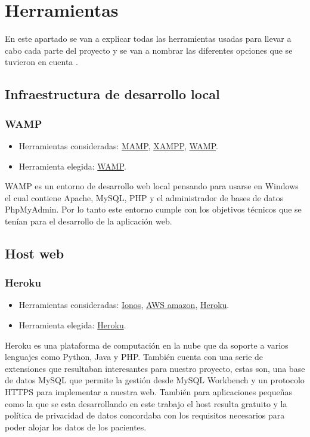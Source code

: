 \section{Herramientas} 

En este apartado se van a explicar todas las herramientas usadas para llevar a cabo cada parte del proyecto y se van a nombrar las diferentes opciones que se tuvieron en cuenta .

\subsection{Infraestructura de desarrollo local}

\subsubsection{WAMP}
\begin{itemize}
    \item Herramientas consideradas: \href{https://www.mamp.info/en/windows/}{MAMP}, \href{https://www.apachefriends.org/es/index.html}{XAMPP}, \href{https://git-scm.com/}{WAMP}.
	\item Herramienta elegida: \href{http://www.wampserver.es/}{WAMP}.
\end{itemize}

WAMP es un entorno de desarrollo web local pensando para usarse en Windows el cual contiene Apache, MySQL, PHP y el administrador de bases de datos PhpMyAdmin. Por lo tanto este entorno cumple con los objetivos técnicos que se tenían para el desarrollo de la aplicación web.

\subsection{Host web}

\subsubsection{Heroku}
\begin{itemize}
    \item Herramientas consideradas: \href{https://www.mamp.info/en/windows/}{Ionos}, \href{https://aws.amazon.com/es/ec2/dedicated-hosts/}{AWS amazon}, \href{https://git-scm.com/}{Heroku}.
    \item Herramienta elegida: \href{http://www.wampserver.es/}{Heroku}.
\end{itemize}

Heroku es una plataforma de computación en la nube que da soporte a varios lenguajes como Python, Java y PHP\cite{heroku}. También cuenta con una serie de extensiones que resultaban interesantes para nuestro proyecto, estas son, una base de datos MySQL que permite la gestión desde MySQL Workbench y un protocolo HTTPS para implementar a nuestra web. También para aplicaciones pequeñas como la que se esta desarrollando en este trabajo el host resulta gratuito y la política de privacidad de datos concordaba con los requisitos necesarios para poder alojar los datos de los pacientes.

